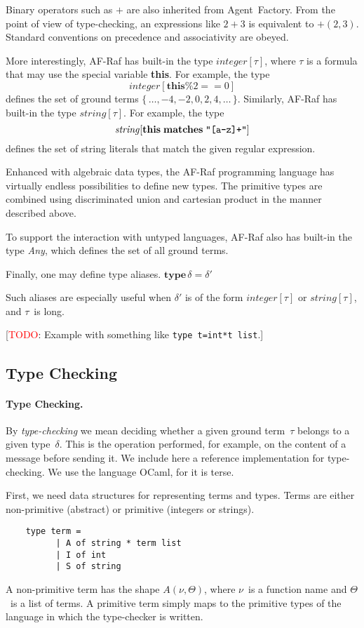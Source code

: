 \documentclass[a4paper,12pt,oneside,fleqn]{book} %
\newcommand{\todo}[1]{[\textcolor{red}{TODO}: #1]}
\begin{document}
Binary operators such as $+$ are also inherited from Agent~Factory. From
the point of view of type-checking, an expressions like $2+3$ is equivalent
to $+(2,3)$. Standard conventions on precedence and associativity are
obeyed.

More interestingly, AF-Raf has built-in the type $\mathit{integer}[\tau]$,
where $\tau$ is a formula that may use the special variable \textbf{this}.
For example, the type \[\mathit{integer}[\mathbf{this}\%2==0]\] defines the
set of ground terms $\{\,\ldots,-4,-2,0,2,4,\ldots\,\}$. Similarly, AF-Raf
has built-in the type $\mathit{string}[\tau]$. For example, the type
\[\mathit{string}[\mathbf{this}\;\mathbf{matches}\;\verb|"[a-z]+"|]\]
defines the set of string literals that match the given regular expression.

Enhanced with algebraic data types, the AF-Raf programming language has
virtually endless possibilities to define new types. The primitive types
are combined using discriminated union and cartesian product in the manner
described above.

To support the interaction with untyped languages, AF-Raf also has built-in
the type \textit{Any}, which defines the set of all ground terms.

Finally, one may define type aliases.
$\mathbf{type}\,\delta=\delta'$

Such aliases are especially useful when $\delta'$ is of the form
$\mathit{integer}[\tau]$ or $\mathit{string}[\tau]$, and $\tau$~is long.

\todo{Example with something like {\tt type t=int*t list}.}

\subsection{Type Checking} %
\paragraph{Type Checking.}
By \emph{type-checking} we mean deciding whether a given ground term~$\tau$
belongs to a given type~$\delta$. This is the operation performed, for
example, on the content of a message before sending it. We include here a
reference implementation for type-checking. We use the language OCaml, for
it is terse.

First, we need data structures for representing terms and types. Terms are
either non-primitive (abstract) or primitive (integers or strings).
\begin{verbatim}
    type term =
          | A of string * term list
          | I of int
          | S of string
\end{verbatim}
A non-primitive term has the shape $A(\nu,\Theta)$, where $\nu$~is a
function name and $\Theta$~is a list of terms. A primitive term simply maps
to the primitive types of the language in which the type-checker is
written.
\end{document}
